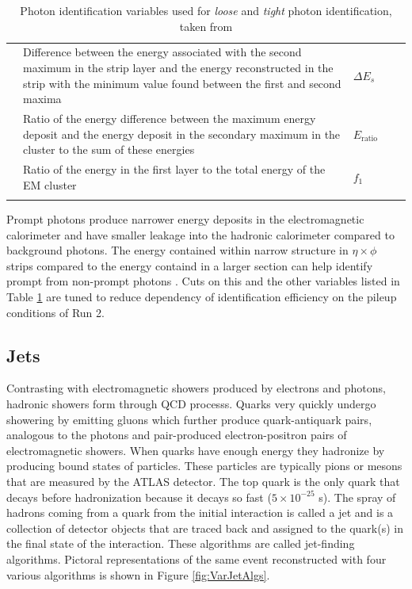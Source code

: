 \begin{center}
\begin{table}
{{\begin{tabularx}{1.25 \textwidth}{ l X lll }
		 & Difference between the energy associated with the second maximum in the strip layer and the energy reconstructed in the strip with the minimum value found between the first and second maxima & $\Delta E_s$ &  &   \checkmark \\
		 & Ratio of the energy difference between the maximum energy deposit and the energy deposit in the secondary maximum in the cluster to the sum of these energies & $E_\text{ratio}$ &  &  \checkmark \\
		 & Ratio of the energy in the first layer to the total energy of the EM cluster & $f_1$ &  &  \checkmark \\
\hhline{=====}
\end{tabularx}
\normalsize
}}
\caption[Photon identification variables used for \textit{loose} and \textit{tight} photon identification]{Photon identification variables used for \textit{loose} and \textit{tight} photon identification, taken from \cite{PhotonID}}
\label{tab:PhotonVars}

\end{table}
\end{center}

Prompt photons produce narrower energy deposits in the electromagnetic calorimeter and have smaller leakage into the hadronic calorimeter compared to background photons.  The energy contained within narrow structure in $\eta \times \phi$ strips compared to the energy containd in a larger section can help identify prompt from non-prompt photons \cite{PhotonID}.  Cuts on this and the other variables listed in Table \ref{tab:PhotonVars} are tuned to reduce dependency of identification efficiency on the pileup conditions of Run 2.


\subsection{Jets}

Contrasting with electromagnetic showers produced by electrons and photons, hadronic showers form through QCD processs.  Quarks very quickly undergo showering by emitting gluons which further produce quark-antiquark pairs, analogous to the photons and pair-produced electron-positron pairs of electromagnetic showers.   When quarks have enough energy they hadronize by producing bound states of particles.  These particles are typically pions or mesons that are measured by the ATLAS detector.  The top quark is the only quark that decays before hadronization because it decays so fast ($5\times10^{-25}$ s).  The spray of hadrons coming from a quark from the initial interaction is called a jet and is a collection of detector objects that are traced back and assigned to the quark(s) in the final state of the interaction.  These algorithms are called jet-finding algorithms.  Pictoral representations of the same event reconstructed with four various algorithms is shown in Figure \ref{fig:VarJetAlgs}.

